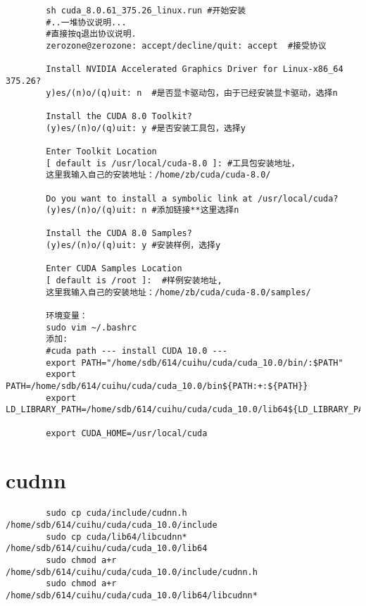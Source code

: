 \documentclass{ctexart}
\begin{document}
	\begin{lstlisting}
		sh cuda_8.0.61_375.26_linux.run #开始安装
		#..一堆协议说明...
		#直接按q退出协议说明.
		zerozone@zerozone: accept/decline/quit: accept  #接受协议
		
		Install NVIDIA Accelerated Graphics Driver for Linux-x86_64 375.26? 
		y)es/(n)o/(q)uit: n  #是否显卡驱动包，由于已经安装显卡驱动，选择n
		
		Install the CUDA 8.0 Toolkit?
		(y)es/(n)o/(q)uit: y #是否安装工具包，选择y
		
		Enter Toolkit Location
		[ default is /usr/local/cuda-8.0 ]: #工具包安装地址，
		这里我输入自己的安装地址：/home/zb/cuda/cuda-8.0/
		
		Do you want to install a symbolic link at /usr/local/cuda?
		(y)es/(n)o/(q)uit: n #添加链接**这里选择n
		
		Install the CUDA 8.0 Samples?
		(y)es/(n)o/(q)uit: y #安装样例，选择y
		
		Enter CUDA Samples Location
		[ default is /root ]:  #样例安装地址,
		这里我输入自己的安装地址：/home/zb/cuda/cuda-8.0/samples/
		
		环境变量：
		sudo vim ~/.bashrc
		添加:
		#cuda path --- install CUDA 10.0 ---
		export PATH="/home/sdb/614/cuihu/cuda/cuda_10.0/bin/:$PATH"
		export PATH=/home/sdb/614/cuihu/cuda/cuda_10.0/bin${PATH:+:${PATH}}
		export LD_LIBRARY_PATH=/home/sdb/614/cuihu/cuda/cuda_10.0/lib64${LD_LIBRARY_PATH:+:${LD_LIBRARY_PATH}}
		
		export CUDA_HOME=/usr/local/cuda
	\end{lstlisting}
	
	
	
	\section{cudnn}
	\begin{lstlisting}
		sudo cp cuda/include/cudnn.h   /home/sdb/614/cuihu/cuda/cuda_10.0/include
		sudo cp cuda/lib64/libcudnn*   /home/sdb/614/cuihu/cuda/cuda_10.0/lib64
		sudo chmod a+r /home/sdb/614/cuihu/cuda/cuda_10.0/include/cudnn.h
		sudo chmod a+r /home/sdb/614/cuihu/cuda/cuda_10.0/lib64/libcudnn*
	\end{lstlisting}
	
\end{document}
